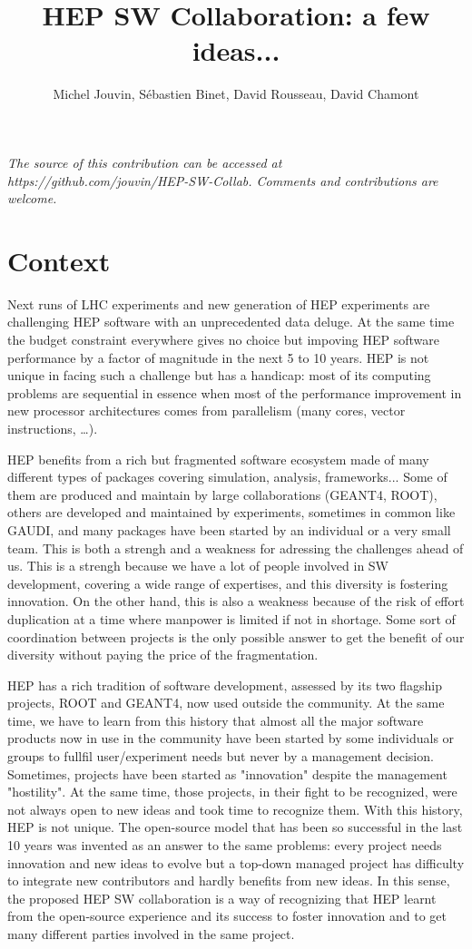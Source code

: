 \documentclass[11pt]{article} %
\title{HEP SW Collaboration: a few ideas...}
\author{Michel Jouvin, S\'ebastien Binet, David Rousseau, David Chamont}
\begin{document}
\maketitle

\emph{The source of this contribution can be accessed at https://github.com/jouvin/HEP-SW-Collab. Comments and contributions are welcome.}

\section{Context}

Next runs of LHC experiments and new generation of HEP experiments are
challenging HEP software with an unprecedented data deluge. At the
same time the budget constraint everywhere gives no choice but
impoving HEP software performance by a factor of magnitude in the next
5 to 10 years. HEP is not unique in facing such a challenge but has a
handicap: most of its computing problems are sequential in essence
when most of the performance improvement in new processor
architectures comes from parallelism (many cores, vector
instructions, \ldots).

HEP benefits from a rich but fragmented software ecosystem made of
many different types of packages covering simulation, analysis,
frameworks... Some of them are produced and maintain by large
collaborations (GEANT4, ROOT), others are developed and maintained by
experiments, sometimes in common like GAUDI, and many packages have
been started by an individual or a very small team. This is both a
strengh and a weakness for adressing the challenges ahead of us. This
is a strengh because we have a lot of people involved in SW
development, covering a wide range of expertises, and this diversity is
fostering innovation. On the other hand, this is also a weakness
because of the risk of effort duplication at a time where manpower is
limited if not in shortage. Some sort of coordination between projects
is the only possible answer to get the benefit of our diversity
without paying the price of the fragmentation.

HEP has a rich tradition of software development, assessed by its two
flagship projects, ROOT and GEANT4, now used outside the community. At
the same time, we have to learn from this history that almost all the
major software products now in use in the community have been started
by some individuals or groups to fullfil user/experiment needs but
never by a management decision. Sometimes, projects have been started
as "innovation" despite the management "hostility". At the same time,
those projects, in their fight to be recognized, were not always open
to new ideas and took time to recognize them. With this history, HEP
is not unique. The open-source model that has been so successful in
the last 10 years was invented as an answer to the same problems:
every project needs innovation and new ideas to evolve but a top-down
managed project has difficulty to integrate new contributors and
hardly benefits from new ideas. In this sense, the proposed HEP SW
collaboration is a way of recognizing that HEP learnt from the
open-source experience and its success to foster innovation and to get
many different parties involved in the same project.
\end{document}
